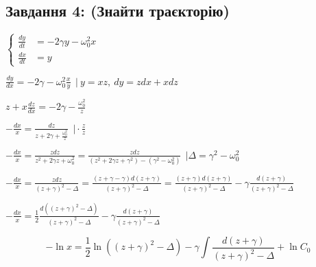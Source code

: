 \subsection{Завдання 4: (Знайти траєкторію)}

$\left\{\begin{aligned}
    \frac{dy}{dt} &= -2\gamma y - \omega_0^2x \\
    \frac{dx}{dt} &= y
\end{aligned}\right.$

$\frac{dy}{dx} = -2\gamma - \omega^2_0 \frac{x}{y} \ \ \Bigg | \ y = xz, \ dy = zdx + xdz$

$z + x\frac{dz}{dx} = -2\gamma - \frac{\omega_0^2}{z}$

$-\frac{dx}{x} = \frac{dz}{z + 2\gamma + \frac{\omega_0^2}{z}} \ \ \Bigg | \cdot \frac{z}{z}$

$-\frac{dx}{x} = \frac{zdz}{z^2 + 2\gamma z + \omega_0^2} = 
\frac{zdz}{(z^2 + 2\gamma z + \gamma ^2) - (\gamma^2 - \omega_0^2)} \ \ \Bigg | \Delta =  \gamma^2 - \omega_0^2$

$-\frac{dx}{x} = \frac{zdz}{(z + \gamma)^2 - \Delta} = 
\frac{(z + \gamma - \gamma)d(z+\gamma)}{(z + \gamma)^2 - \Delta} = 
\frac{(z + \gamma)d(z+\gamma)}{(z + \gamma)^2 - \Delta} - \gamma\frac{d(z+\gamma)}{(z + \gamma)^2 - \Delta}$

$-\frac{dx}{x} = \frac{1}{2}\frac{d((z+\gamma)^2 - \Delta)}{(z + \gamma)^2 - \Delta} - \gamma\frac{d(z+\gamma)}{(z + \gamma)^2 - \Delta}$

\begin{equation} \label{pr3:eq8}
    -\ln x = \frac{1}{2} \ln {((z+\gamma)^2 - \Delta)} - \gamma \int \frac{d(z+\gamma)}{(z + \gamma)^2 - \Delta} + \ln C_0
\end{equation}




